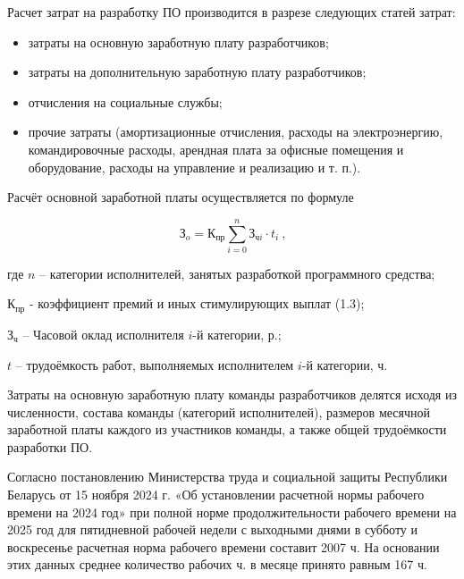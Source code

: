Расчет затрат на разработку ПО производится в разрезе следующих статей затрат:

\begin{itemize}
	\item затраты на основную заработную плату разработчиков;
	\item затраты на дополнительную заработную плату разработчиков;
	\item отчисления на социальные службы;
	\item прочие затраты (амортизационные отчисления, расходы на 
		электроэнергию, командировочные расходы, арендная плата за офисные
		помещения и оборудование, расходы на управление и реализацию и т. п.).
\end{itemize}

Расчёт основной заработной платы осуществляется по формуле

\begin{equation}
	\label{eq:зарплата}
	\text{З}_o = \text{К}_{\text{пр}}\sum_{i=0}^{n} \text{З}_{\text{ч}i} \cdot t_i
	\ \text{,}
\end{equation}


\begin{explanationx}
	\item[где]  $n$  -- категории исполнителей, занятых разработкой
		программного средства;
	\item $\text{К}_\text{пр}$ - коэффициент премий и иных стимулирующих
		выплат (\num{1.3});
	\item $\text{З}_\text{ч}$ --  Часовой оклад исполнителя $i\text{-й}$
		категории, р.;
	\item $t$  -- трудоёмкость работ, выполняемых исполнителем $i\text{-й}$
		категории, ч.
\end{explanationx}


Затраты на основную заработную плату команды разработчиков
делятся исходя из численности, состава команды (категорий исполнителей), 
размеров месячной заработной платы каждого из участников команды, а также
общей трудоёмкости разработки ПО. 

\def \hoursPerMonth {167}

Согласно постановлению Министерства труда и социальной защиты Республики
Беларусь от 15 ноября 2024 г.  «Об установлении расчетной нормы рабочего
времени на 2024 год» при полной норме продолжительности рабочего времени на
2025 год для пятидневной рабочей недели с выходными днями в субботу и
воскресенье расчетная норма рабочего времени составит \num{2007} ч. На основании
этих данных среднее количество рабочих ч. в месяце принято равным
\hoursPerMonth{} ч.

